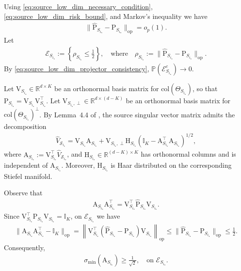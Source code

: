 \documentclass[10pt]{article}
\newcommand{\R}{\mathbb R}
\newcommand{\op}{\mathrm{op}}
\newcommand{\col}{\mathrm{col}}
\newcommand{\Id}{\mathbb I}
\newcommand{\wh}{\widehat}
\newcommand{\calS}{\mathcal S}
\newcommand{\src}{S}
\newcommand{\ThetamS}[1]{\Theta_{\src_{#1}}}
\begin{document}
Using \eqref{eq:source_low_dim_necessary_condition}, \eqref{eq:source_low_dim_risk_bound}, and Markov's inequality we have
\begin{align}
\label{eq:source_low_dim_projector_consistency}
    \|\widehat{\mathrm P}_{\src_{i_\star}}-\mathrm P_{\src_{i_\star}}\|_{\op}=o_p(1).
\end{align}
Let
\begin{align}
\label{eq:source_low_dim_good_projector_event}
    \mathcal E_{\src_{i_\star}}:=\left\{\rho_{\src_{i_\star}}\le \frac12\right\}, \quad \mbox{where}\quad \rho_{\src_{i_\star}}:=\|\widehat{\mathrm P}_{\src_{i_\star}}-\mathrm P_{\src_{i_\star}}\|_{\op}.
\end{align}
By \eqref{eq:source_low_dim_projector_consistency}, $\mathbb P(\mathcal E_{\src_{i_\star}}^c)\to0$.

Let $\mathrm V_{\src_{i_\star}}\in\R^{d\times K}$ be an orthonormal basis matrix for $\col(\ThetamS{i_\star})$, so that $\mathrm P_{\src_{i_\star}}=\mathrm V_{\src_{i_\star}}\mathrm V_{\src_{i_\star}}^\top$. Let $\mathrm V_{\src_{i_\star},\perp}\in\R^{d\times(d-K)}$ be an orthonormal basis matrix for $\col(\ThetamS{i_\star})^\perp$. By Lemma~4.4 of \citet{LofflerZhangZhou2021}, the source singular vector matrix admits the decomposition
\begin{align}
\label{eq:source_low_dim_haar_decomp}
    \wh V_{\calS_{i_\star}}=\mathrm V_{\src_{i_\star}}\mathrm A_{\src_{i_\star}}+\mathrm V_{\src_{i_\star},\perp}\mathrm H_{\src_{i_\star}}\left(\Id_K-\mathrm A_{\src_{i_\star}}^\top\mathrm A_{\src_{i_\star}}\right)^{1/2},
\end{align}
where $\mathrm A_{\src_{i_\star}}:=\mathrm V_{\src_{i_\star}}^\top\wh V_{\calS_{i_\star}}$, and $\mathrm H_{\src_{i_\star}}\in\R^{(d-K)\times K}$ has orthonormal columns and is independent of $\mathrm A_{\src_{i_\star}}$. Moreover, $\mathrm H_{\src_{i_\star}}$ is Haar distributed on the corresponding Stiefel manifold.

Observe that
\begin{align}
    \mathrm A_{\src_{i_\star}}\mathrm A_{\src_{i_\star}}^\top=\mathrm V_{\src_{i_\star}}^\top\widehat{\mathrm P}_{\src_{i_\star}}\mathrm V_{\src_{i_\star}}.
\end{align}
Since $\mathrm V_{\src_{i_\star}}^\top\mathrm P_{\src_{i_\star}}\mathrm V_{\src_{i_\star}}=\Id_K$, on $\mathcal E_{\src_{i_\star}}$ we have
\begin{align}
    \|\mathrm A_{\src_{i_\star}}\mathrm A_{\src_{i_\star}}^\top-\Id_K\|_{\op}=\left\|\mathrm V_{\src_{i_\star}}^\top(\widehat{\mathrm P}_{\src_{i_\star}}-\mathrm P_{\src_{i_\star}})\mathrm V_{\src_{i_\star}}\right\|_{\op}\le \|\widehat{\mathrm P}_{\src_{i_\star}}-\mathrm P_{\src_{i_\star}}\|_{\op}\le \frac12.
\end{align}
Consequently,
\begin{align}
\label{eq:source_low_dim_A_min_singular}
    \sigma_{\min}(\mathrm A_{\src_{i_\star}})\ge \frac{1}{\sqrt2}, \quad \mbox{on $\mathcal E_{\src_{i_\star}}$.}
\end{align}
\end{document}
